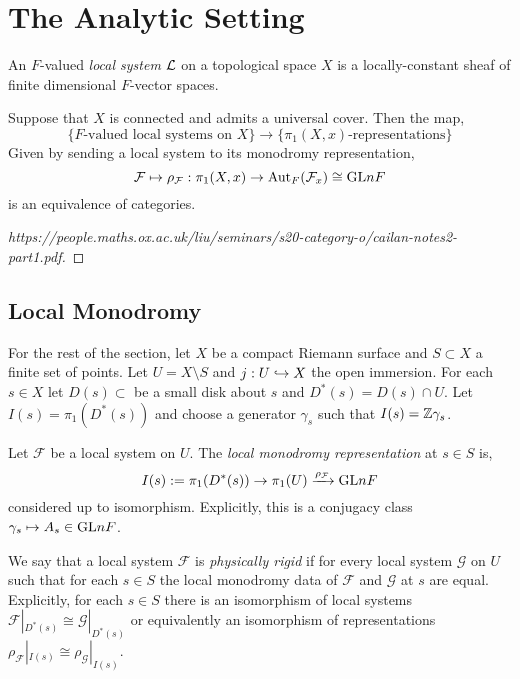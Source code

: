 \documentclass[12pt]{article}
\begin{document}
\section{The Analytic Setting}

\renewcommand{\F}{\mathcal{F}}
\renewcommand{\G}{\mathcal{G}}

\begin{defn}
An $F$-valued \textit{local system} $\mathcal{L}$ on a topological space $X$ is a locally-constant sheaf of finite dimensional $F$-vector spaces.
\end{defn}

\begin{prop}
Suppose that $X$ is connected and admits a universal cover. Then the map,
\[ \{ F\text{-valued local systems on } X \} \to \{ \pi_1(X, x)\text{-representations} \} \]
Given by sending a local system to its monodromy representation,
\[ \F \mapsto \rho_\F : \pi_1(X,x) \to \mathrm{Aut}_F(\F_x) \cong \GL{n}{F} \]
is an equivalence of categories.
\end{prop}

\begin{proof}
[https://people.maths.ox.ac.uk/liu/seminars/s20-category-o/cailan-notes2-part1.pdf]
\end{proof}

\subsection{Local Monodromy}

\begin{rmk}
For the rest of the section, let $X$ be a compact Riemann surface and $S \subset X$ a finite set of points. Let $U = X \setminus S$ and $j : U \hookrightarrow X$ the open immersion. For each $s \in X$ let $D(s) \subset $ be a small disk about $s$ and $D^*(s) = D(s) \cap U$. Let $I(s) = \pi_1(D^*(s))$ and choose a generator $\gamma_s$ such that $I(s) = \mathbb{Z} \gamma_s$.
\end{rmk}

\begin{defn}
Let $\F$ be a local system on $U$. The \textit{local monodromy representation} at $s \in S$ is,
\[ I(s) := \pi_1(D^*(s)) \to \pi_1(U) \xrightarrow{\rho_\F} \GL{n}{F} \] 
considered up to isomorphism. Explicitly, this is a conjugacy class $\gamma_s \mapsto A_s \in \mathrm{GL}{n}{F}$.
\end{defn}

\begin{defn}
We say that a local system $\F$ is \textit{physically rigid} if for every local system $\G$ on $U$ such that for each $s \in S$ the local monodromy data of $\F$ and $\G$ at $s$ are equal. Explicitly, for each $s \in S$ there is an isomorphism of local systems $\F |_{D^*(s)} \cong \G |_{D^*(s)}$ or equivalently an isomorphism of representations $\rho_{\F}|_{I(s)} \cong \rho_{\G}|_{I(s)}$.
\end{defn}
\end{document}

